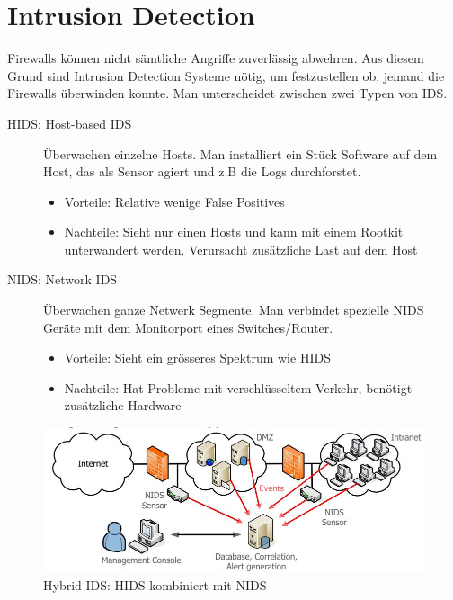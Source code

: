 \section{Intrusion Detection}
Firewalls können nicht sämtliche Angriffe zuverlässig abwehren. Aus diesem Grund sind Intrusion Detection Systeme nötig, um festzustellen ob, jemand die Firewalls überwinden konnte. Man unterscheidet zwischen zwei Typen von IDS.
\begin{description}
	\item[HIDS: Host-based IDS] Überwachen einzelne Hosts. Man installiert ein Stück Software auf dem Host, das als Sensor agiert und z.B die Logs durchforstet.
	\begin{itemize}
		\item Vorteile: Relative wenige False Positives
		\item Nachteile: Sieht nur einen Hosts und kann mit einem Rootkit unterwandert werden. Verursacht zusätzliche Last auf dem Host
	\end{itemize}
	\item[NIDS: Network IDS] Überwachen ganze Netwerk Segmente. Man verbindet spezielle NIDS Geräte mit dem Monitorport eines Switches/Router.
	\begin{itemize}
		\item Vorteile: Sieht ein grösseres Spektrum wie HIDS
		\item Nachteile: Hat Probleme mit verschlüsseltem Verkehr, benötigt zusätzliche Hardware
	\end{itemize}
\end{description}

\begin{figure}[h]
\centering
\includegraphics[width=0.7\linewidth]{images/hybrid_ids}
\caption{Hybrid IDS: HIDS kombiniert mit NIDS}
\label{fig:nids}
\end{figure}


